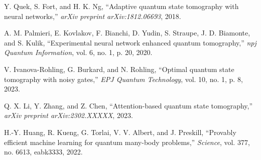\documentclass[conference]{IEEEtran}
\begin{document}
\begin{thebibliography}{10}
Y. Quek, S. Fort, and H. K. Ng, ``Adaptive quantum state tomography with neural networks,'' \emph{arXiv preprint arXiv:1812.06693}, 2018.

A. M. Palmieri, E. Kovlakov, F. Bianchi, D. Yudin, S. Straupe, J. D. Biamonte, and S. Kulik, ``Experimental neural network enhanced quantum tomography,'' \emph{npj Quantum Information}, vol. 6, no. 1, p. 20, 2020.

V. Ivanova-Rohling, G. Burkard, and N. Rohling, ``Optimal quantum state tomography with noisy gates,'' \emph{EPJ Quantum Technology}, vol. 10, no. 1, p. 8, 2023.

Q. X. Li, Y. Zhang, and Z. Chen, ``Attention-based quantum state tomography,'' \emph{arXiv preprint arXiv:2302.XXXXX}, 2023.

H.-Y. Huang, R. Kueng, G. Torlai, V. V. Albert, and J. Preskill, ``Provably efficient machine learning for quantum many-body problems,'' \emph{Science}, vol. 377, no. 6613, eabk3333, 2022.

\end{thebibliography}
\end{document}
